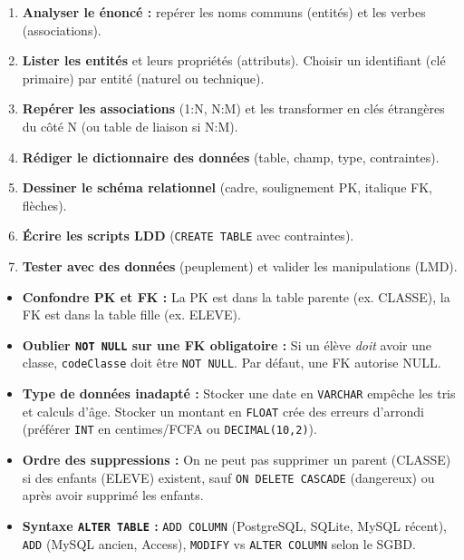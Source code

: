 \documentclass[11pt]{article}
\begin{document}
\begin{methode}
\begin{enumerate}
\item \textbf{Analyser le énoncé :} repérer les noms communs (entités) et les verbes (associations).
\item \textbf{Lister les entités} et leurs propriétés (attributs). Choisir un identifiant (clé primaire) par entité (naturel ou technique).
\item \textbf{Repérer les associations} (1:N, N:M) et les transformer en clés étrangères du côté \og N \fg (ou table de liaison si N:M).
\item \textbf{Rédiger le dictionnaire des données} (table, champ, type, contraintes).
\item \textbf{Dessiner le schéma relationnel} (cadre, soulignement PK, italique FK, flèches).
\item \textbf{Écrire les scripts LDD} (\texttt{CREATE TABLE} avec contraintes).
\item \textbf{Tester avec des données} (peuplement) et valider les manipulations (LMD).
\end{enumerate}
\end{methode}

\begin{attention}
\begin{itemize}
\item \textbf{Confondre PK et FK :} La PK est dans la table \og parente \fg (ex. CLASSE), la FK est dans la table \og fille \fg (ex. ELEVE).
\item \textbf{Oublier \texttt{NOT NULL} sur une FK obligatoire :} Si un élève \emph{doit} avoir une classe, \texttt{codeClasse} doit être \texttt{NOT NULL}. Par défaut, une FK autorise NULL.
\item \textbf{Type de données inadapté :} Stocker une date en \texttt{VARCHAR} empêche les tris et calculs d'âge. Stocker un montant en \texttt{FLOAT} crée des erreurs d'arrondi (préférer \texttt{INT} en centimes/FCFA ou \texttt{DECIMAL(10,2)}).
\item \textbf{Ordre des suppressions :} On ne peut pas supprimer un parent (CLASSE) si des enfants (ELEVE) existent, sauf \texttt{ON DELETE CASCADE} (dangereux) ou après avoir supprimé les enfants.
\item \textbf{Syntaxe \texttt{ALTER TABLE} :} \texttt{ADD COLUMN} (PostgreSQL, SQLite, MySQL récent), \texttt{ADD} (MySQL ancien, Access), \texttt{MODIFY} vs \texttt{ALTER COLUMN} selon le SGBD.
\end{itemize}
\end{attention}
\end{document}
